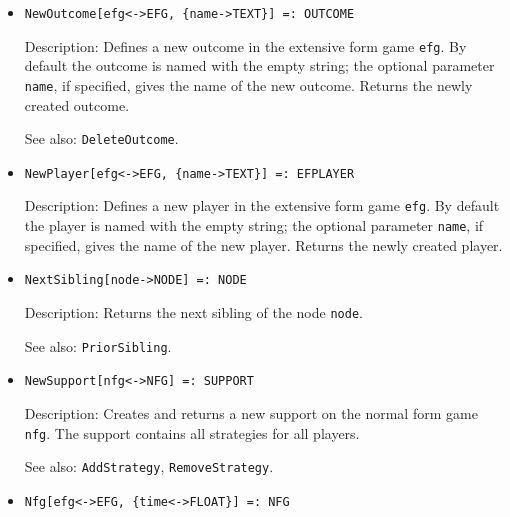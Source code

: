 \begin{itemize}
\item
\protect \large \begin{verbatim} 
NewOutcome[efg<->EFG, {name->TEXT}] =: OUTCOME
\end{verbatim}\normalsize

\bd
\item
[Description:] Defines a new outcome in the extensive form game \verb+efg+.
By default the outcome is named with the empty string; the optional parameter
\verb+name+, if specified, gives the name of the new outcome.  Returns the
newly created outcome.
\item
[See also:] {\tt DeleteOutcome}.
\ed

\item
\protect \large \begin{verbatim}
NewPlayer[efg<->EFG, {name->TEXT}] =: EFPLAYER 
\end{verbatim}\normalsize

\bd
\item
[Description:] Defines a new player in the extensive form game \verb+efg+.
By default the player is named with the empty string; the optional parameter
\verb+name+, if specified, gives the name of the new player.  Returns the
newly created player.
\ed

\item
\protect \large \begin{verbatim}
NextSibling[node->NODE] =: NODE
\end{verbatim}\normalsize

\bd
\item
[Description:] Returns the next sibling of the node \verb+node+.
\item
[See also:] {\tt PriorSibling}.
\ed

\item
\protect \large \begin{verbatim}
NewSupport[nfg<->NFG] =: SUPPORT
\end{verbatim}\normalsize

\bd
\item
[Description:] Creates and returns a new support on the normal form
game \verb+nfg+.  The support contains all strategies for all players.
\item
[See also:] {\tt AddStrategy}, {\tt RemoveStrategy}.
\ed

\item
\protect \large \begin{verbatim}
Nfg[efg<->EFG, {time<->FLOAT}] =: NFG
\end{verbatim}\normalsize


\end{itemize}
